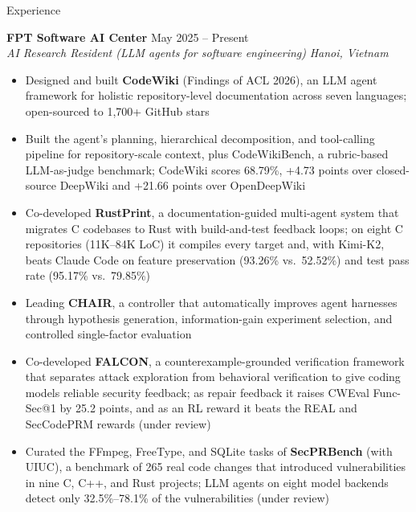\documentclass{resume} %
\begin{document}
\begin{rSection}{Experience}

\textbf{FPT Software AI Center} \hfill May 2025 -- Present\\
\textit{AI Research Resident (LLM agents for software engineering)}
\hfill \textit{Hanoi, Vietnam}

\begin{itemize}[leftmargin=1.5em,itemsep=0em,topsep=0.1em]
    \item Designed and built \textbf{CodeWiki} (Findings of ACL 2026), an LLM agent
    framework for holistic repository-level documentation across seven
    languages; open-sourced to 1,700+ GitHub stars
    \item Built the agent's planning, hierarchical decomposition, and
    tool-calling pipeline for repository-scale context, plus CodeWikiBench, a
    rubric-based LLM-as-judge benchmark; CodeWiki scores 68.79\%, +4.73 points
    over closed-source DeepWiki and +21.66 points over OpenDeepWiki
    \item Co-developed \textbf{RustPrint}, a documentation-guided multi-agent
    system that migrates C codebases to Rust with build-and-test feedback
    loops; on eight C repositories (11K--84K LoC) it compiles every target and,
    with Kimi-K2, beats Claude Code on feature preservation (93.26\% vs.\
    52.52\%) and test pass rate (95.17\% vs.\ 79.85\%)
    \item Leading \textbf{CHAIR}, a controller that automatically improves agent
    harnesses through hypothesis generation, information-gain experiment
    selection, and controlled single-factor evaluation
    \item Co-developed \textbf{FALCON}, a counterexample-grounded verification
    framework that separates attack exploration from behavioral verification
    to give coding models reliable security feedback; as repair feedback it
    raises CWEval Func-Sec@1 by 25.2 points, and as an RL reward it beats the
    REAL and SecCodePRM rewards (under review)
    \item Curated the FFmpeg, FreeType, and SQLite tasks of \textbf{SecPRBench}
    (with UIUC), a benchmark of 265 real code changes that introduced
    vulnerabilities in nine C, C++, and Rust projects; LLM agents on eight model backends detect
    only 32.5\%--78.1\% of the vulnerabilities (under review)
\end{itemize}

\vspace{0.3em}


\end{rSection}
\end{document}
